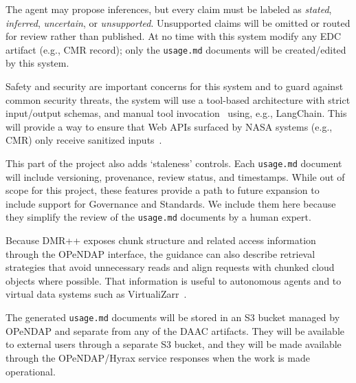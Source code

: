 \documentclass[11pt]{article}
\begin{document}
The agent may propose inferences, but every claim must be labeled as {\em
stated}, {\em inferred}, {\em uncertain}, or {\em unsupported}. Unsupported
claims will be omitted or routed for review rather than published. At no time
with this system modify any \ac{EDC} artifact (e.g., \ac{CMR} record); only the
\texttt{usage.md} documents will be created/edited by this system.

Safety and security are important concerns for this system and to guard against
common security threats, the system will use a tool-based architecture with 
strict input/output schemas, and manual tool invocation~\cite{maloyan2026prompt} using, e.g., LangChain.
This will provide a way to ensure that Web APIs surfaced by NASA systems (e.g.,
\ac{CMR}) only receive sanitized inputs~\cite{liu2023prompt}\cite{zhan-etal-2024-injecagent}.

This part of the project also adds `staleness' controls. Each \texttt{usage.md} document will include
versioning, provenance, review status, and timestamps. While out of scope for
this project, these features provide a path to future expansion to include support for
Governance and Standards. We include them here because they simplify the review
of the \texttt{usage.md} documents by a human expert.

Because \ac{DMR++} exposes chunk structure and related access information
through the \acs{OPeNDAP} interface, the guidance can also describe retrieval
strategies that avoid unnecessary reads and align requests with chunked cloud
objects where possible. That information is useful to autonomous agents and to
virtual data systems such as VirtualiZarr~\cite{nicholas_2026_virtualizarr}.

The generated \texttt{usage.md} documents will be stored in an S3 bucket managed
by \ac{OPeNDAP} and separate from any of the \acs{DAAC} artifacts. They will be
available to external users through a separate S3 bucket, and they will be made
available through the \ac{OPeNDAP}/Hyrax service responses when the work is made
operational.


\end{document}
